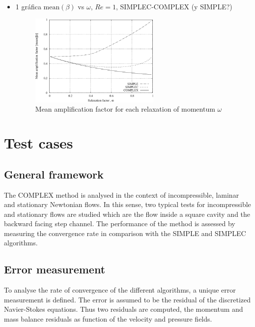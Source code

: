 \documentclass[final,3p,times,10pt,onecolumn]{myElsarticle}
\numberwithin{equation}{section}
\begin{document}
\begin{itemize}
    
    \item 1 gráfica $\text{mean} (\beta)$ vs $\omega$, $Re=1$, SIMPLEC-COMPLEX (y SIMPLE?)

    \begin{figure}[H]
        \centering
        \includegraphics[width=0.6\textwidth]{fig/meanAmp}
        \caption{Mean amplification factor for each relaxation of momentum $\omega$}
        \label{fig:1d}
    \end{figure}  
    
\end{itemize}

\section{Test cases}
\label{sec:cases}

\subsection{General framework}
The COMPLEX method is analysed in the context of incompressible, laminar and stationary Newtonian flows. In this sense, two typical tests for incompressible and stationary flows are studied which are the flow inside a square cavity and the backward facing step channel. The performance of the method is assessed by measuring the convergence rate in comparison with the SIMPLE and SIMPLEC algorithms.

\subsection{Error measurement}
To analyse the rate of convergence of the different algorithms, a unique error measurement is defined. The error is assumed to be the residual of the discretized Navier-Stokes equations. Thus two residuals are computed, the momentum and mass balance residuals as function of the velocity and pressure fields. 
\end{document}
